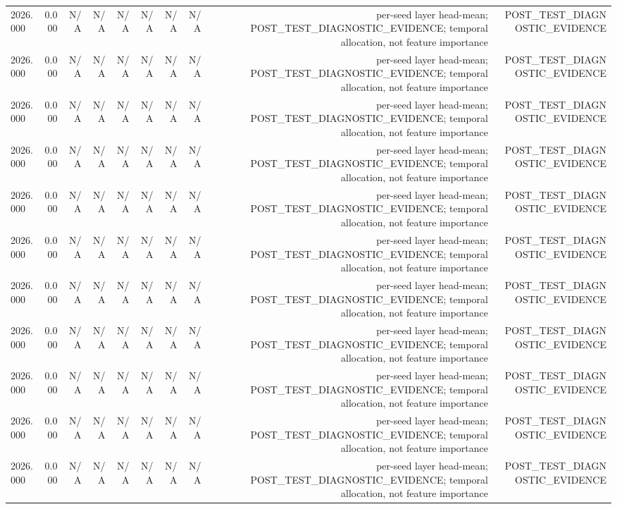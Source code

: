 \begin{table}[h!]
\begin{tabular}{lrrrrrrrrr}
2026.000 & 0.000 & N/A & N/A & N/A & N/A & N/A & N/A & per-seed layer head-mean; POST\_TEST\_DIAGNOSTIC\_EVIDENCE; temporal allocation, not feature importance & POST\_TEST\_DIAGNOSTIC\_EVIDENCE \\
2026.000 & 0.000 & N/A & N/A & N/A & N/A & N/A & N/A & per-seed layer head-mean; POST\_TEST\_DIAGNOSTIC\_EVIDENCE; temporal allocation, not feature importance & POST\_TEST\_DIAGNOSTIC\_EVIDENCE \\
2026.000 & 0.000 & N/A & N/A & N/A & N/A & N/A & N/A & per-seed layer head-mean; POST\_TEST\_DIAGNOSTIC\_EVIDENCE; temporal allocation, not feature importance & POST\_TEST\_DIAGNOSTIC\_EVIDENCE \\
2026.000 & 0.000 & N/A & N/A & N/A & N/A & N/A & N/A & per-seed layer head-mean; POST\_TEST\_DIAGNOSTIC\_EVIDENCE; temporal allocation, not feature importance & POST\_TEST\_DIAGNOSTIC\_EVIDENCE \\
2026.000 & 0.000 & N/A & N/A & N/A & N/A & N/A & N/A & per-seed layer head-mean; POST\_TEST\_DIAGNOSTIC\_EVIDENCE; temporal allocation, not feature importance & POST\_TEST\_DIAGNOSTIC\_EVIDENCE \\
2026.000 & 0.000 & N/A & N/A & N/A & N/A & N/A & N/A & per-seed layer head-mean; POST\_TEST\_DIAGNOSTIC\_EVIDENCE; temporal allocation, not feature importance & POST\_TEST\_DIAGNOSTIC\_EVIDENCE \\
2026.000 & 0.000 & N/A & N/A & N/A & N/A & N/A & N/A & per-seed layer head-mean; POST\_TEST\_DIAGNOSTIC\_EVIDENCE; temporal allocation, not feature importance & POST\_TEST\_DIAGNOSTIC\_EVIDENCE \\
2026.000 & 0.000 & N/A & N/A & N/A & N/A & N/A & N/A & per-seed layer head-mean; POST\_TEST\_DIAGNOSTIC\_EVIDENCE; temporal allocation, not feature importance & POST\_TEST\_DIAGNOSTIC\_EVIDENCE \\
2026.000 & 0.000 & N/A & N/A & N/A & N/A & N/A & N/A & per-seed layer head-mean; POST\_TEST\_DIAGNOSTIC\_EVIDENCE; temporal allocation, not feature importance & POST\_TEST\_DIAGNOSTIC\_EVIDENCE \\
2026.000 & 0.000 & N/A & N/A & N/A & N/A & N/A & N/A & per-seed layer head-mean; POST\_TEST\_DIAGNOSTIC\_EVIDENCE; temporal allocation, not feature importance & POST\_TEST\_DIAGNOSTIC\_EVIDENCE \\
2026.000 & 0.000 & N/A & N/A & N/A & N/A & N/A & N/A & per-seed layer head-mean; POST\_TEST\_DIAGNOSTIC\_EVIDENCE; temporal allocation, not feature importance & POST\_TEST\_DIAGNOSTIC\_EVIDENCE \\

\end{tabular}
\end{table}
